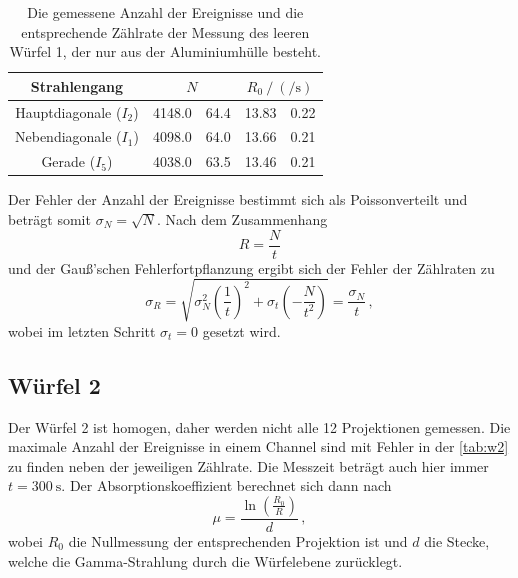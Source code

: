   \begin{table}[H]
    \centering
    \caption{Die gemessene Anzahl der Ereignisse und die entsprechende Zählrate der Messung des leeren Würfel 1, der nur aus der Aluminiumhülle besteht.}
    \label{tab:w1}
    \begin{tabular}{c S[table-format=4.1] @{${}\pm{}$} S[table-format=2.1] S[table-format=2.2] @{${}\pm{}$} S[table-format=1.2]}
        \toprule
        {Strahlengang} &  &  \\
        \midrule
        Hauptdiagonale ($I_2$) &  4148.0 & 64.4  &  13.83 & 0.22  \\ 
        Nebendiagonale ($I_1$) &  4098.0 & 64.0  &  13.66 & 0.21  \\ 
        Gerade ($I_5$)         &  4038.0 & 63.5  &  13.46 & 0.21  \\ 
        \bottomrule 
    \end{tabular}
  \end{table}

  \noindent Der Fehler der Anzahl der Ereignisse bestimmt sich als Poissonverteilt und beträgt somit $\sigma_N =\sqrt{N}$. Nach dem Zusammenhang 
  \begin{equation*}
    R = \frac{N}{t}
  \end{equation*}
  und der Gauß'schen Fehlerfortpflanzung ergibt sich der Fehler der Zählraten zu
  \begin{equation*}
    \sigma_R = \sqrt{\sigma_N^2 \left(\frac{1}{t}\right)^2 + \sigma_t \left(- \frac{N}{t^2}\right) } = \frac{\sigma_N}{t} \, ,
  \end{equation*}
  wobei im letzten Schritt $\sigma_t = 0 $ gesetzt wird. 
  
\subsection{Würfel 2}

  \noindent Der Würfel 2 ist homogen, daher werden nicht alle 12 Projektionen gemessen. Die maximale Anzahl der Ereignisse in einem Channel sind mit 
  Fehler in der \autoref{tab:w2} zu finden neben der jeweiligen Zählrate. Die Messzeit beträgt auch hier immer $t = \SI{300}{\second}$. Der 
  Absorptionskoeffizient berechnet sich dann nach 
  \begin{equation*}
    \mu = \frac{\ln\left(\frac{R_0}{R}\right)}{d} \, ,
  \end{equation*}
  wobei $R_0$ die Nullmessung der entsprechenden Projektion ist und $d$ die Stecke, welche die Gamma-Strahlung durch die Würfelebene zurücklegt. 
  
